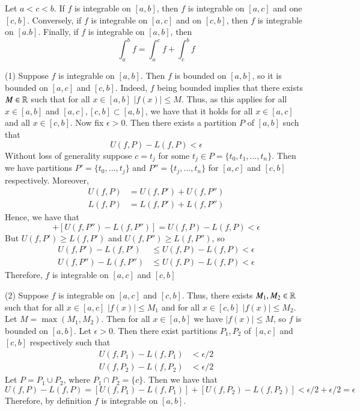 \documentclass[12pt]{report}
\begin{document}
\begin{thm}{}{}
    Let $a < c < b$. If $f$ is integrable on $[a,b]$, then $f$ is integrable on $[a,c]$ and one $[c,b]$. Conversely, if $f$ is integrable on $[a,c]$ and on $[c,b]$, then $f$ is integrable on $[a.b]$. Finally, if $f$ is integrable on $[a,b]$, then \begin{equation}
        \int_a^bf = \int_a^cf + \int_c^bf
    \end{equation}
\end{thm}
\begin{proof*}{}{}

    (1) Suppose $f$ is integrable on $[a,b]$. Then $f$ is bounded on $[a,b]$, so it is bounded on $[a,c]$ and $[c,b]$. Indeed, $f$ being bounded implies that there exists $M \in \mathbb R$ such that for all $x \in [a,b]$ $|f(x)| \leq M$. Thus, as this applies for all $x \in [a,b]$ and $[a,c],[c,b] \subset [a,b]$, we have that it holds for all $x \in [a,c]$ and all $x \in [c,b]$. Now fix $\epsilon > 0$. Then there exists a partition $P$ of $[a,b]$ such that $$U(f,P) - L(f,P) < \epsilon$$
    Without loss of generality suppose $c=t_j$ for some $t_j \in P = \{t_0,t_1,...,t_n\}$. Then we have partitions $P' = \{t_0,...,t_j\}$ and $P'' = \{t_j,...,t_n\}$ for $[a,c]$ and $[c,b]$ respectively. Moreover, \begin{align*}
        U(f,P) &= U(f,P') + U(f,P'') \\
        L(f,P) &= L(f,P') + L(f,P'')
    \end{align*}
    Hence, we have that \begin{equation*}
        [U(f,P') - L(f,P')] + [U(f,P'') - L(f,P'')] = U(f,P) - L(f,P) < \epsilon
    \end{equation*}
    But $U(f,P') \geq L(f,P')$ and $U(f,P'') \geq L(f,P'')$, so \begin{align*}
        U(f,P') - L(f,P') &\leq U(f,P) - L(f,P) < \epsilon \\
        U(f,P'') - L(f,P'') &\leq U(f,P) - L(f,P) < \epsilon
    \end{align*}
    Therefore, $f$ is integrable on $[a,c]$ and $[c,b]$


    (2) Suppose $f$ is integrable on $[a,c]$ and $[c,b]$. Thus, there exists $M_1, M_2 \in \mathbb R$ such that for all $x \in [a,c]$ $|f(x)| \leq M_1$ and for all $x \in [c,b]$ $|f(x)| \leq M_2$. Let $M = \max(M_1,M_2)$. Then for all $x \in [a,b]$ we have $|f(x)| \leq M$, so $f$ is bounded on $[a,b]$. Let $\epsilon > 0$. Then there exist partitions $P_1,P_2$ of $[a,c]$ and $[c,b]$ respectively such that \begin{align*}
        U(f,P_1) - L(f,P_1) &< \epsilon/2 \\
        U(f,P_2) - L(f,P_2) &< \epsilon/2
    \end{align*}
    Let $P = P_1 \cup P_2$, where $P_1 \cap P_2 = \{c\}$. Then we have that \begin{equation*}
        U(f,P) - L(f,P) = [U(f,P_1) - L(f,P_1)] + [U(f,P_2) - L(f,P_2)] < \epsilon/2 + \epsilon/2 = \epsilon
    \end{equation*}
    Therefore, by definition $f$ is integrable on $[a,b]$.
    


\end{proof*}
\end{document}
